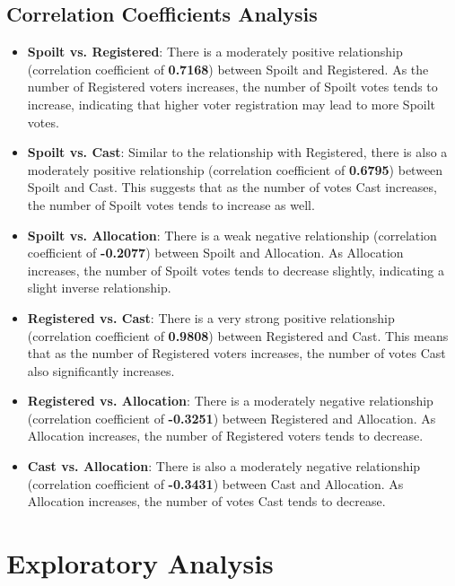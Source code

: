 \documentclass[fleqn,a4paper,12pt]{article}
\begin{document}
\subsection{Correlation Coefficients Analysis}

\begin{itemize}
\item \textbf{Spoilt vs. Registered}: There is a moderately positive relationship (correlation coefficient of \textbf{0.7168}) between Spoilt and Registered. As the number of Registered voters increases, the number of Spoilt votes tends to increase, indicating that higher voter registration may lead to more Spoilt votes.
\item \textbf{Spoilt vs. Cast}: Similar to the relationship with Registered, there is also a moderately positive relationship (correlation coefficient of \textbf{0.6795}) between Spoilt and Cast. This suggests that as the number of votes Cast increases, the number of Spoilt votes tends to increase as well.
\end{itemize}

\begin{itemize}
\item \textbf{Spoilt vs. Allocation}: There is a weak negative relationship (correlation coefficient of \textbf{-0.2077}) between Spoilt and Allocation. As Allocation increases, the number of Spoilt votes tends to decrease slightly, indicating a slight inverse relationship.
\item \textbf{Registered vs. Cast}: There is a very strong positive relationship (correlation coefficient of \textbf{0.9808}) between Registered and Cast. This means that as the number of Registered voters increases, the number of votes Cast also significantly increases.
\end{itemize}

\begin{itemize}
\item \textbf{Registered vs. Allocation}: There is a moderately negative relationship (correlation coefficient of \textbf{-0.3251}) between Registered and Allocation. As Allocation increases, the number of Registered voters tends to decrease.
\item \textbf{Cast vs. Allocation}: There is also a moderately negative relationship (correlation coefficient of \textbf{-0.3431}) between Cast and Allocation. As Allocation increases, the number of votes Cast tends to decrease.
\end{itemize}

\section{Exploratory Analysis}
\end{document}
